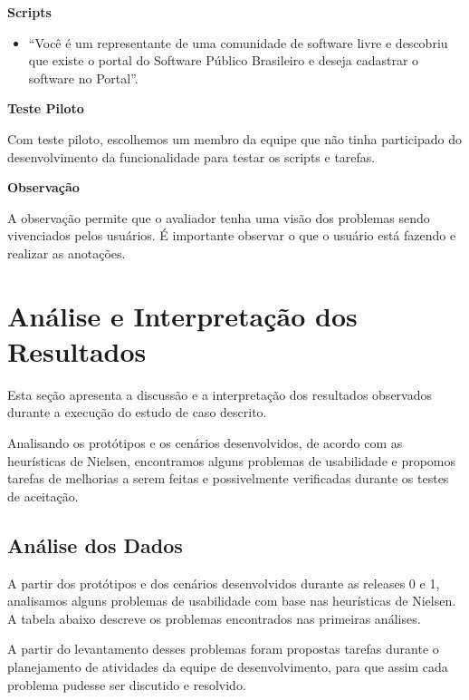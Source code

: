 	\textbf{Scripts}%

	\begin{itemize}
	
		\item ``Você é um representante de uma comunidade de software livre e descobriu que existe o portal do Software Público Brasileiro e deseja cadastrar o software no Portal''.

	\end{itemize}
			
	\textbf{Teste Piloto}
	
	Com teste piloto, escolhemos um membro da equipe que não tinha participado do desenvolvimento da funcionalidade para testar os scripts e tarefas. %
	
	\textbf{Observação}
	
		A observação permite que o avaliador tenha uma visão dos problemas sendo vivenciados pelos usuários. É importante observar o que o usuário está fazendo e realizar as anotações. %
	

\section{Análise e Interpretação dos Resultados}

Esta seção apresenta a discussão e a interpretação dos resultados observados durante a execução do estudo de caso descrito.

Analisando os protótipos e os cenários desenvolvidos, de acordo com as heurísticas de Nielsen, encontramos alguns problemas de usabilidade e propomos tarefas de melhorias a serem feitas e possivelmente verificadas durante os testes de aceitação.


\subsection{Análise dos Dados}

A partir dos protótipos e dos cenários desenvolvidos durante as releases 0 e 1, analisamos alguns problemas de usabilidade com base nas heurísticas de Nielsen. A tabela abaixo descreve os problemas encontrados nas primeiras análises.

A partir do levantamento desses problemas foram propostas tarefas durante o planejamento de atividades da equipe de desenvolvimento, para que assim cada problema pudesse ser discutido e resolvido.


